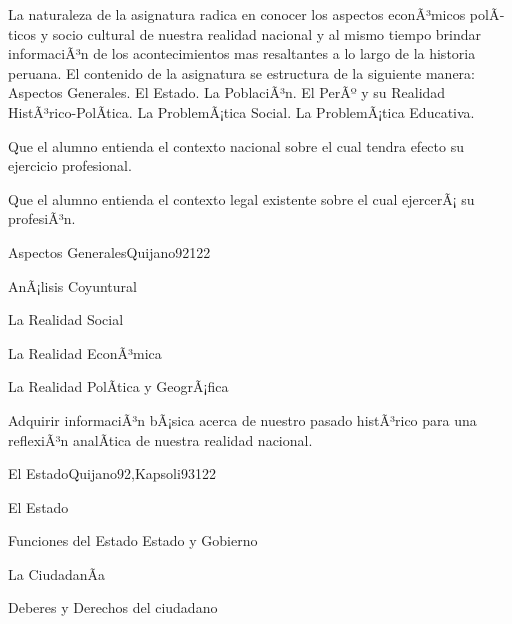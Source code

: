 \begin{syllabus}


\begin{justification}
La naturaleza de la asignatura radica en conocer los aspectos econÃ³micos polÃ­ticos y socio cultural de nuestra realidad nacional y al mismo tiempo brindar informaciÃ³n de los acontecimientos mas resaltantes a lo largo de la historia peruana. El contenido de la asignatura se estructura de la siguiente manera: Aspectos Generales. El Estado. La PoblaciÃ³n. El PerÃº y su Realidad HistÃ³rico-PolÃ­tica. La ProblemÃ¡tica Social. La ProblemÃ¡tica Educativa.
\end{justification}

\begin{goals}
\item Que el alumno entienda el contexto nacional sobre el cual tendra efecto su ejercicio profesional.
\item Que el alumno entienda el contexto legal existente sobre el cual ejercerÃ¡ su profesiÃ³n.
\end{goals}

\begin{outcomes}
\end{outcomes}

\begin{unit}{Aspectos Generales}{Quijano92}{12}{2}
\begin{topics}
	\item AnÃ¡lisis Coyuntural
  	\item La Realidad Social
  	\item La Realidad EconÃ³mica
  	\item La Realidad PolÃ­tica y GeogrÃ¡fica
\end{topics}

\begin{unitgoals}
      \item  Adquirir informaciÃ³n bÃ¡sica acerca de nuestro pasado histÃ³rico para una reflexiÃ³n analÃ­tica de nuestra realidad nacional.
   \end{unitgoals}
\end{unit}

\begin{unit}{El Estado}{Quijano92,Kapsoli93}{12}{2}
\begin{topics}
	\item El Estado
	\item Funciones del Estado Estado y Gobierno
	\item La CiudadanÃ­a
	\item Deberes y Derechos del ciudadano
\end{topics}


\end{unit}
\end{syllabus}

